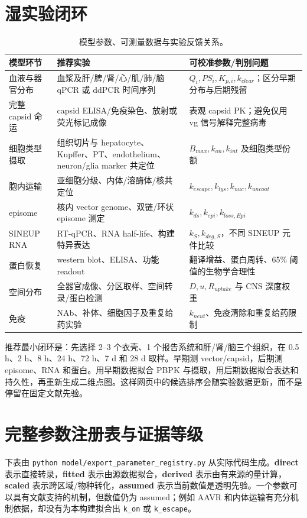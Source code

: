 \documentclass[UTF8,11pt,a4paper]{ctexart}
\newcommand{\code}[1]{\texttt{#1}}
\begin{document}
\section{湿实验闭环}

\begin{table}[H]
\centering
\caption{模型参数、可测量数据与实验反馈关系。}
\begin{tabularx}{\textwidth}{p{}p{}X}
\toprule
模型环节 & 推荐实验 & 可校准参数/判别问题 \\
\midrule
血液与器官分布 & 血浆及肝/脾/肾/心/肌/肺/脑 qPCR 或 ddPCR 时间序列 & $Q_i,PS_i,K_{p,i},k_{clear}$；区分早期分布与后期残留 \\
完整 capsid 命运 & capsid ELISA/免疫染色、放射或荧光标记成像 & 表观 capsid PK；避免仅用 vg 信号解释完整病毒 \\
细胞类型摄取 & 组织切片与 hepatocyte、Kupffer、PT、endothelium、neuron/glia marker 共定位 & $B_{max},k_{on},k_{int}$ 及细胞类型份额 \\
胞内运输 & 亚细胞分级、内体/溶酶体/核共定位 & $k_{escape},k_{lys},k_{nuc},k_{uncoat}$ \\
episome & 核内 vector genome、双链/环状 episome 测定 & $k_{ds},k_{epi},k_{loss,Epi}$ \\
SINEUP RNA & RT-qPCR、RNA half-life、构建特异表达 & $k_{S},k_{deg,S}$，不同 SINEUP 元件比较 \\
蛋白恢复 & western blot、ELISA、功能 readout & 翻译增益、蛋白周转、65\% 阈值的生物学合理性 \\
空间分布 & 全器官成像、分区取样、空间转录/蛋白检测 & $D,u,R_{uptake}$ 与 CNS 深度权重 \\
免疫 & NAb、补体、细胞因子及重复给药实验 & $k_{neut}$、免疫清除和重复给药限制 \\
\bottomrule
\end{tabularx}
\end{table}

推荐最小闭环是：先选择 2--3 个衣壳、1 个报告系统和肝/肾/脑三个组织，在 0.5 h、2 h、8 h、24 h、72 h、7 d 和 28 d 取样。早期测 vector/capsid，后期测 episome、RNA 和蛋白。用早期数据拟合 PBPK 与摄取，用后期数据拟合表达和持久性，再重新生成二维点图。这样网页中的候选排序会随实验数据更新，而不是停留在固定文献先验。

\section{完整参数注册表与证据等级}

下表由 \code{python model/export\_parameter\_registry.py} 从实际代码生成。\textbf{direct} 表示直接转录，\textbf{fitted} 表示由源数据拟合，\textbf{derived} 表示由有来源的量计算，\textbf{scaled} 表示跨区域/物种转化，\textbf{assumed} 表示当前数值是透明先验。一个参数可以具有文献支持的机制，但数值仍为 assumed；例如 AAVR 和内体运输有充分机制依据，却没有为本构建拟合出 \code{k\_on} 或 \code{k\_escape}。
\end{document}
